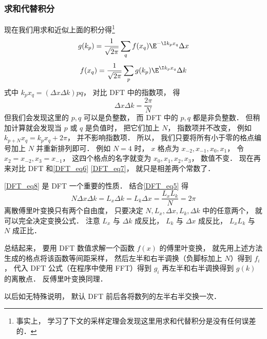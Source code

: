 \subsubsection{求和代替积分}
现在我们用求和近似上面的积分得\footnote{事实上， 学习了下文的采样定理会发现这里用求和代替积分是没有任何误差的．}
\begin{equation}\label{DFT_eq6}
g(k_p) = \frac{1}{\sqrt{2\pi}} \sum_q f(x_q) \E^{-\I k_p x_q} \Delta x
\end{equation}
\begin{equation}\label{DFT_eq7}
f(x_q) = \frac{1}{\sqrt{2\pi}} \sum_p g(k_p) \E^{\I k_p x_q} \Delta k
\end{equation}
式中 $k_p x_q = (\Delta x \Delta k)pq$， 对比 DFT 中的指数项， 得
\begin{equation}\label{DFT_eq8}
\Delta x\Delta k = \frac{2\pi}{N}
\end{equation}
但我们会发现这里的 $p, q$ 可以是负整数， 而 DFT 中的 $p, q$ 都是非负整数． 但稍加计算就会发现当 $p$ 或 $q$ 是负值时， 把它们加上 $N$， 指数项并不改变， 例如 $k_{p+N} x_q = k_p x_q + 2\pi$， 并不影响指数项． 所以， 我们只要将所有小于零的格点编号加上 $N$ 并重新排列即可． 例如 $N = 4$ 时， $x$ 格点为 $x_{-2}, x_{-1}, x_0, x_1$， 令 $x_2 = x_{-2}, x_3 = x_{-1}$， 这四个格点的名字就变为 $x_0, x_1, x_2, x_3$， 数值不变． 现在再来对比 DFT 和\autoref{DFT_eq6} \autoref{DFT_eq7}， 就只是相差两个常数了．

\autoref{DFT_eq8} 是 DFT 一个重要的性质． 结合\autoref{DFT_eq5} 得
\begin{equation}\label{DFT_eq9}
N\Delta x \Delta k = L_x \Delta k = L_k \Delta x = \frac{L_x L_k}{N} = 2\pi
\end{equation}
离散傅里叶变换只有两个自由度， 只要决定 $N, L_x, \Delta x, L_k, \Delta k$ 中的任意两个， 就可以完全决定变换公式． 注意 $L_x$ 与 $\Delta k$ 成反比， $L_k$ 与 $\Delta x$ 成反比， $L_xL_k$ 与 $N$ 成正比．

总结起来， 要用 DFT 数值求解一个函数 $f(x)$ 的傅里叶变换， 就先用上述方法生成的格点将该函数等间距采样， 然后左半和右半调换（负脚标加上 $N$）得到 $f_i$， 代入 DFT 公式（在程序中使用 FFT）得到 $g_i$ 再左半和右半调换得到 $g(k)$ 的离散点． 反傅里叶变换同理．

以后如无特殊说明， 默认 DFT 前后各将数列的左半右半交换一次．


